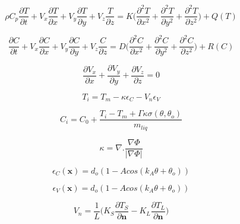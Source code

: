 \documentclass[12pt]{extarticle}
\begin{document}
\begin{equation}
\rho C_{p} \frac{\partial T}{\partial t} + V_{x} \frac{\partial T}{\partial x} + V_{y} \frac{\partial T}{\partial y} + V_{z} \frac{T}{\partial z} = K \Big( \frac{\partial^{2} T}{\partial x^{2}}+\frac{\partial^{2} T}{\partial y^{2}}+\frac{\partial^{2} T}{\partial z^{2}} \Big) + Q(T)
\end{equation}

\begin{equation}
\frac{\partial C}{\partial t} + V_{x} \frac{\partial C}{\partial x} + V_{y} \frac{\partial C}{\partial y} + V_{z} \frac{C}{\partial z} = D \Big( \frac{\partial^{2} C}{\partial x^{2}}+\frac{\partial^{2} C}{\partial y^{2}}+\frac{\partial^{2} C}{\partial z^{2}} \Big) + R(C)
\end{equation}

\begin{equation}
\frac{\partial V_{x}}{\partial x} + \frac{\partial V_{y}}{\partial y}+\frac{\partial V_{z}}{\partial z} = 0
\end{equation}

\begin{equation}
T_{i}  = T_{m} - \kappa \epsilon_{C} - V_{n} \epsilon_{V}
\label{surf_tension1}
\end{equation}

\begin{equation}
C_{i}  = C_{0} + \frac{T_{i} - T_{m} + \Gamma \kappa \sigma(\theta, \theta_{o})}{m_{liq}}
\label{surf_tension1}
\end{equation}

\begin{equation}
\kappa = \nabla  . \frac{\nabla  \Phi}{\left| \nabla  \Phi \right|}
\end{equation}

\begin{equation}
\epsilon_{C}(\textbf{x}) = d_{o} (1 - A cos (k_{A} \theta + \theta_{o}))
\label{surf_tension2}
\end{equation}

\begin{equation}
\epsilon_{V}(\textbf{x}) = d_{o} (1 - A cos (k_{A} \theta + \theta_{o}))
\end{equation}

\begin{equation} \label{interface_eq}
V_{n} = \frac{1}{L} \Bigg(K_{S} \frac{\partial T_{S}}{\partial \textbf{n}} - K_{L} \frac{\partial T_{L}}{\partial \textbf{n}} \Bigg)
\end{equation}
\end{document}

